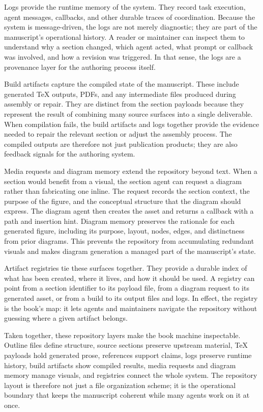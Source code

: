 Logs provide the runtime memory of the system. They record task execution, agent messages, callbacks, and other durable traces of coordination. Because the system is message-driven, the logs are not merely diagnostic; they are part of the manuscript's operational history. A reader or maintainer can inspect them to understand why a section changed, which agent acted, what prompt or callback was involved, and how a revision was triggered. In that sense, the logs are a provenance layer for the authoring process itself.

Build artifacts capture the compiled state of the manuscript. These include generated \TeX{} outputs, PDFs, and any intermediate files produced during assembly or repair. They are distinct from the section payloads because they represent the result of combining many source surfaces into a single deliverable. When compilation fails, the build artifacts and logs together provide the evidence needed to repair the relevant section or adjust the assembly process. The compiled outputs are therefore not just publication products; they are also feedback signals for the authoring system.

Media requests and diagram memory extend the repository beyond text. When a section would benefit from a visual, the section agent can request a diagram rather than fabricating one inline. The request records the section context, the purpose of the figure, and the conceptual structure that the diagram should express. The diagram agent then creates the asset and returns a callback with a path and insertion hint. Diagram memory preserves the rationale for each generated figure, including its purpose, layout, nodes, edges, and distinctness from prior diagrams. This prevents the repository from accumulating redundant visuals and makes diagram generation a managed part of the manuscript's state.

Artifact registries tie these surfaces together. They provide a durable index of what has been created, where it lives, and how it should be used. A registry can point from a section identifier to its payload file, from a diagram request to its generated asset, or from a build to its output files and logs. In effect, the registry is the book's map: it lets agents and maintainers navigate the repository without guessing where a given artifact belongs.

Taken together, these repository layers make the book machine inspectable. Outline files define structure, source sections preserve upstream material, \TeX{} payloads hold generated prose, references support claims, logs preserve runtime history, build artifacts show compiled results, media requests and diagram memory manage visuals, and registries connect the whole system. The repository layout is therefore not just a file organization scheme; it is the operational boundary that keeps the manuscript coherent while many agents work on it at once.

